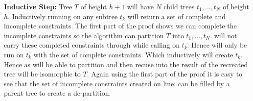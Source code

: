 \textbf{Inductive Step:} Tree $T$ of height $h+1$ will have $N$ child trees $t_1, \ldots, t_N$ of height $h$. Inductively running  on any subtree $t_k$ will return a set of complete and incomplete constraints. The first part of the proof shows we can complete the incomplete constraints so the  algorithm can partition $T$ into $t_1, \ldots, t_N$.  will not carry these completed constraints through while calling  on $t_k$. Hence  will only be run on $t_k$ with the set of complete constraints. Which inductively will create $t_k$. Hence as  will be able to partition and then recuse into the result of  the recreated tree will be isomorphic to $T$. Again using the first part of the proof it is easy to see that the set of incomplete constraints created on line: can be filled by a parent tree to create a de-partition. 

